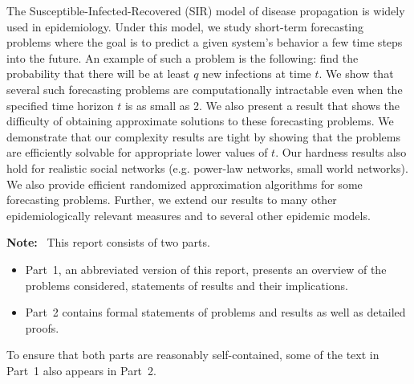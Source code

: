\documentclass[11pt]{article}
\begin{document}
The Susceptible-Infected-Recovered (SIR) model of disease
propagation is widely used in epidemiology.  
Under this model, we study short-term forecasting problems
where the goal is to predict a given system's 
behavior a few time steps into the future. 
An example of such a problem is the following: find
the probability that there will be at least $q$ new
infections at time $t$.
We show that several such forecasting problems are computationally
intractable even when the specified time horizon $t$ is as small as 2.
We also present a result that shows the difficulty of obtaining
approximate solutions to these forecasting problems.
We demonstrate that our complexity results are tight by 
showing that the problems
are efficiently solvable for appropriate lower values of $t$.
Our hardness results also hold for realistic social networks
(e.g. power-law networks, small world networks).
We also provide efficient randomized approximation
algorithms for some forecasting problems.
Further, we extend our results to many other epidemiologically
relevant measures and to several other epidemic models.

\bigskip\bigskip

\noindent
\textbf{Note:}~ This report consists of two parts. 
\begin{itemize}
\item
Part~1, an abbreviated version of this report,
presents an overview of the problems considered, statements of results and 
their implications.

\item
Part~2 contains formal statements of problems and results as well 
as detailed proofs.
\end{itemize}

\smallskip
\noindent
To ensure that both parts are reasonably self-contained,
some of the text in Part~1 also appears in Part~2.



\iffalse
\bigskip\bigskip


\noindent
\textbf{Acknowledgments:}~ 
This work has been partially supported by
DTRA Grant HDTRA1-11-1-0016 and 
DTRA CNIMS Contract HDTRA1-11-D-0016-0010.
\fi

\setcounter{page}{0}
\clearpage
\thispagestyle{empty}

\vspace*{4in}
\end{document}
